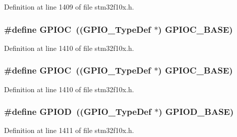 Definition at line 1409 of file stm32f10x.\+h.

\subsubsection[{\texorpdfstring{G\+P\+I\+OC}{GPIOC}}]{\setlength{\rightskip}{0pt plus 5cm}\#define G\+P\+I\+OC~(({\bf G\+P\+I\+O\+\_\+\+Type\+Def} $\ast$) {\bf G\+P\+I\+O\+C\+\_\+\+B\+A\+SE})}\hypertarget{group___peripheral__declaration_ga2dca03332d620196ba943bc2346eaa08}{}\label{group___peripheral__declaration_ga2dca03332d620196ba943bc2346eaa08}


Definition at line 1410 of file stm32f10x.\+h.

\subsubsection[{\texorpdfstring{G\+P\+I\+OC}{GPIOC}}]{\setlength{\rightskip}{0pt plus 5cm}\#define G\+P\+I\+OC~(({\bf G\+P\+I\+O\+\_\+\+Type\+Def} $\ast$) {\bf G\+P\+I\+O\+C\+\_\+\+B\+A\+SE})}\hypertarget{group___peripheral__declaration_ga2dca03332d620196ba943bc2346eaa08}{}\label{group___peripheral__declaration_ga2dca03332d620196ba943bc2346eaa08}


Definition at line 1410 of file stm32f10x.\+h.

\subsubsection[{\texorpdfstring{G\+P\+I\+OD}{GPIOD}}]{\setlength{\rightskip}{0pt plus 5cm}\#define G\+P\+I\+OD~(({\bf G\+P\+I\+O\+\_\+\+Type\+Def} $\ast$) {\bf G\+P\+I\+O\+D\+\_\+\+B\+A\+SE})}\hypertarget{group___peripheral__declaration_ga7580b1a929ea9df59725ba9c18eba6ac}{}\label{group___peripheral__declaration_ga7580b1a929ea9df59725ba9c18eba6ac}


Definition at line 1411 of file stm32f10x.\+h.

